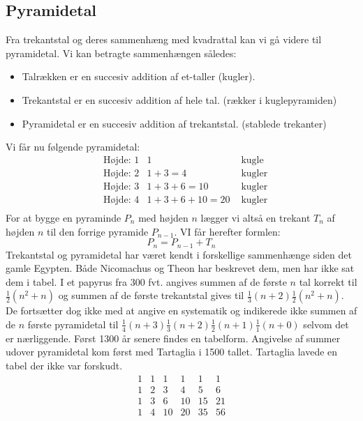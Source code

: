 \subsection{Pyramidetal}
Fra trekantstal og deres sammenhæng med kvadrattal kan vi gå videre til pyramidetal. Vi kan betragte sammenhængen således: 
\begin{itemize}
\item Talrækken er en succesiv addition af et-taller (kugler). 
\item Trekantstal er en succesiv addition af hele tal. (rækker i kuglepyramiden)
\item Pyramidetal er en succesiv addition af trekantstal. (stablede trekanter)
\end{itemize}
Vi får nu følgende pyramidetal:
\begin{align*}
&\text{Højde: } 1 &1 &\text{ kugle }\\
&\text{Højde: } 2 &1+3=4 &\text{ kugler}\\
&\text{Højde: } 3 &1+3+6=10 &\text{ kugler}\\
&\text{Højde: } 4 &1+3+6+10=20 &\text{ kugler}\\
\end{align*}
For at bygge en pyraminde \(P_{n}\) med højden \(n\) lægger vi altså en trekant \(T_{n}\) af højden \(n\) til den forrige pyramide \(P_{n-1}\). VI får herefter formlen:
\begin{equation}
P_{n}=P_{n-1}+T_{n}
\end{equation}
Trekantstal og pyramidetal har været kendt i forskellige sammenhænge siden det gamle Egypten. Både Nicomachus og Theon har beskrevet dem, men har ikke sat dem i tabel. I et papyrus fra 300 fvt. angives summen af de første \(n\) tal korrekt til \(\frac{1}{2}(n^{2}+n)\) og summen af de første trekantstal gives til \(\frac{1}{3}(n+2)\frac{1}{2}(n^{2}+n)\). De fortsætter dog ikke med at angive en systematik og indikerede ikke summen af de \(n\) første pyramidetal til \(\frac{1}{4}(n+3)\frac{1}{3}(n+2)\frac{1}{2}(n+1)\frac{1}{1}(n+0)\) selvom det er nærliggende. Først 1300 år senere findes en tabelform. Angivelse af summer udover pyramidetal kom først med Tartaglia i 1500 tallet. Tartaglia lavede en tabel der ikke var forskudt. 
\begin{equation}
\begin{array}{rrrrrr}
1&1&1&1&1&1\\
1&2&3&4&5&6\\
1&3&6&10&15&21\\
1&4&10&20&35&56\\
\end{array}
\end{equation}
